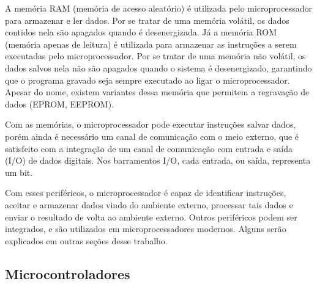 

A memória RAM (memória de acesso aleatório) é utilizada pelo microprocessador para armazenar e ler dados. Por se tratar de uma memória volátil, os dados contidos nela são apagados quando é desenergizada.
Já a memória ROM (memória apenas de leitura) é utilizada para armazenar as instruções a serem executadas pelo microprocessador. Por se tratar de uma memória não volátil, os dados salvos nela não são apagados quando o sistema é desenergizado, garantindo que o programa gravado seja sempre executado ao ligar o microprocessador. Apesar do nome, existem variantes dessa memória que permitem a regravação de dados (EPROM, EEPROM).

Com as memórias, o microprocessador pode executar instruções salvar dados, porém ainda é necessário um canal de comunicação com o meio externo, que é satisfeito com a integração de um canal de comunicação com entrada e saída (I/O) de dados digitais. Nos barramentos I/O, cada entrada, ou saída, representa um bit. 

Com esses periféricos, o microprocessador é capaz de identificar instruções, aceitar e armazenar dados vindo do ambiente externo, processar tais dados e enviar o resultado de volta ao ambiente externo. Outros periféricos podem ser integrados, e são utilizados em microprocessadores modernos. Alguns serão explicados em outras seções desse trabalho.


\subsection{Microcontroladores}

